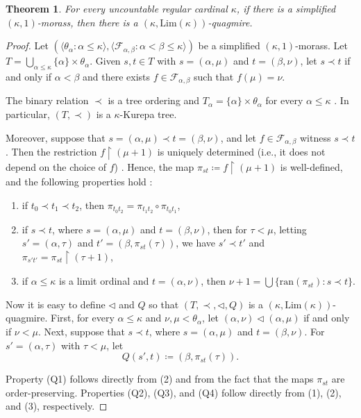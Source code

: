 \documentclass[]{amsart}
\newtheorem{theorem}{Theorem}
\theoremstyle{definition}
\theoremstyle{remark}
\begin{document}
\begin{theorem}\label{thm:quagmire}
For every uncountable regular cardinal $\kappa$, if there is a simplified $(\kappa, 1)$-morass, then there is a $(\kappa, \mathrm{Lim}(\kappa))$-quagmire.
\end{theorem}
\begin{proof}

Let $(\langle \theta_\alpha : \alpha \le \kappa\rangle, \langle \mathcal{F}_{\alpha, \beta} : \alpha < \beta \le \kappa\rangle)$ be a simplified $(\kappa, 1)$-morass. 
Let $T = \bigcup_{\alpha \le \kappa} \{\alpha\} \times \theta_\alpha$. Given $s,t \in T$ with $s = (\alpha, \mu)$ and $t = (\beta, \nu)$, let $s \prec t$ if and only if $\alpha < \beta$ and there exists $f \in \mathcal{F}_{\alpha, \beta}$ such that $f(\mu) = \nu$. 

The binary relation $\prec$ is a tree ordering and $T_\alpha = \{\alpha\} \times \theta_\alpha$ for every $\alpha \le \kappa$ \cite[Theorem 3.1]{MR736620}. In particular, $(T, \prec)$ is a $\kappa$-Kurepa tree.

Moreover, suppose that $s=(\alpha,\mu)\prec t=(\beta,\nu)$, and let $f\in\mathcal F_{\alpha,\beta}$ witness $s\prec t$. Then the restriction $f\upharpoonright(\mu+1)$ is uniquely determined (i.e., it does not depend on the choice of $f$) \cite[Lemma 3.2]{MR736620}. Hence, the map $\pi_{st} \coloneqq f \upharpoonright (\mu +1)$ is well-defined, and the following properties hold \cite[Theorem 3.3]{MR736620}:
\begin{enumerate}
\item if $t_0 \prec t_1 \prec t_2$, then $\pi_{t_0 t_2} = \pi_{t_1 t_2} \circ \pi_{t_0 t_1}$,
\item if $s \prec t$, where $s = (\alpha, \mu)$ and $t = (\beta, \nu)$, then for $\tau < \mu$, letting $s' = (\alpha, \tau)$ and $t' = (\beta, \pi_{st}(\tau))$, we have $s' \prec t'$ and $\pi_{s't'} = \pi_{st} \upharpoonright (\tau + 1)$,
\item if $\alpha \le \kappa$ is a limit ordinal and $t = (\alpha, \nu)$, then $\nu + 1 = \bigcup \{\mathrm{ran}(\pi_{st}) : s \prec t\}$.
\end{enumerate}

Now it is easy to define $\lhd$ and $Q$ so that $(T, \prec, \lhd, Q)$ is a $(\kappa, \mathrm{Lim}(\kappa))$-quagmire. First, for every $\alpha \le \kappa$ and $\nu, \mu < \theta_\alpha$, let $(\alpha, \nu) \lhd (\alpha, \mu)$ if and only if $\nu < \mu$. Next, suppose that $s \prec t$, where $s = (\alpha, \mu)$ and $t = (\beta, \nu)$. For $s' = (\alpha, \tau)$ with $\tau < \mu$, let 
\[
Q(s', t) \coloneqq (\beta, \pi_{st}(\tau)).
\]

Property (Q1) follows directly from (2) and from the fact that the maps $\pi_{st}$ are order-preserving. Properties (Q2), (Q3), and (Q4) follow directly from (1), (2), and (3), respectively.
\end{proof}
\end{document}

